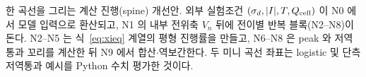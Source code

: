 \caption{한 곡선을 그리는 계산 진행(spine) 개선안. 외부 실험조건 $(\sigma_d,|I|,T,Q_\cell)$ 이 N0 에서 모델 입력으로 환산되고, N1 의 내부 전위축 $V_n$ 뒤에 전이별 반복 블록(N2--N8)이 돈다. N2--N5 는 식~\eqref{eq:xieq} 계열의 평형 진행률을 만들고, N6--N8 은 peak 와 저역통과 꼬리를 계산한 뒤 N9 에서 합산$\cdot$역보간한다. 두 미니 곡선 좌표는 logistic 및 단측 저역통과 예시를 Python 수치 평가한 것이다.}
\label{fig:spine}
